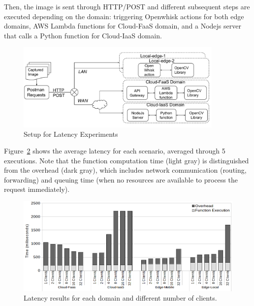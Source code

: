 Then, the image is sent through HTTP/POST and different subsequent steps are executed depending on the domain: triggering Openwhisk actions for both edge domains, AWS Lambda functions for Cloud-FaaS domain, and a Nodejs server that calls a Python function for Cloud-IaaS domain.



\begin{figure}[htb]
	
	\centering
	\includegraphics[width=0.9\textwidth]{figs/experimental-setup.pdf}
	\caption{Setup for Latency Experiments}
	\label{fig:exp-setup1}
\end{figure}


 Figure~\ref{fig:latency-domains} shows the average latency for each scenario, averaged through 5 executions. Note that the function computation time (light gray) is distinguished from the overhead (dark gray), which includes network communication (routing, forwarding) and queuing time (when no resources are available to process the request immediately). 

\begin{figure}
	
	\centering
	\includegraphics[width=1\textwidth]{figs/latency-domains}
	\caption{Latency results for each domain and different number of clients.}
	\label{fig:latency-domains}
\end{figure}


